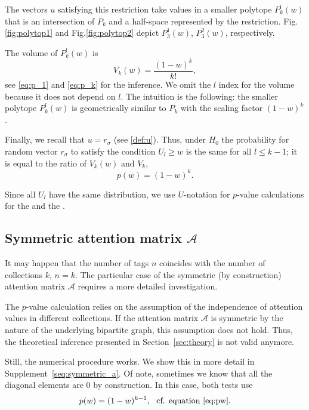 \documentclass{llncs}
\begin{document}
The vectors $u$ satisfying this restriction take values in a smaller polytope $P^{l}_{k}(w)$ that is an intersection of $P_{k}$ and a half-space represented by the restriction.
Fig.\ref{fig:polytop1} and Fig.\ref{fig:polytop2} depict $P^{1}_{3}(w)$, $P^{2}_{3}(w)$, respectively. 

The volume of $P^{l}_{k}(w)$ is 
\begin{equation}
V_{k}(w) = \frac{(1-w)^k}{k!},
\end{equation}
see \eqref{eq:p_1} and \eqref{eq:p_k} for the inference. We omit the $l$ index for the volume because it does not depend on $l$. The intuition is the following: the smaller polytope $P^{l}_{k}(w)$ is geometrically similar to $P_{k}$ with the scaling factor $(1-w)^k$. 

Finally, we recall that $u = r_{\sigma}$ (see \eqref{def:u}). Thus, under $H_0$ the probability for random vector $r_{\sigma}$ to satisfy the condition $U_{l} \ge w$ is the same for all $l\leq k-1$; it is equal to the ratio of $V_{k}(w)$ and $V_k$,
\begin{equation}
\label{eq:pw}
    p(w) = (1-w)^k.
\end{equation}



Since all $U_l$ have the same distribution, we use $U$-notation for $p$-value calculations for the  and the .


\subsection{Symmetric attention matrix $\mathcal{A}$}
It may happen that the number of tags $n$ coincides with the number of collections $k$, $n = k$. The particular case of the symmetric (by construction) attention matrix $\mathcal{A}$ requires a more detailed investigation.

The $p$-value calculation relies on the assumption of the independence of attention values in different collections. If the attention matrix $\mathcal{A}$ is symmetric by the nature of the underlying bipartite graph, this assumption does not hold. Thus, the theoretical inference presented in Section~\ref{sec:theory} is not valid anymore.

Still, the numerical procedure works. We show this in more detail in Supplement~\ref{seq:symmetric_a}. Of note, sometimes we know that all the diagonal elements are $0$ by construction. In this case, both tests use 
\[
p(w) = (1-w)^{k-1}, ~~\text{cf. equation \eqref{eq:pw}.}
\]
\end{document}
